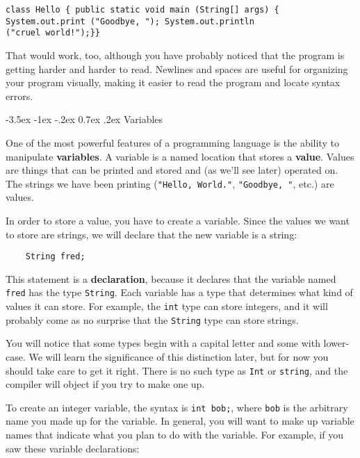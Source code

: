 \documentclass{book}
\makeatletter
\renewcommand{\section}{\@startsection 
    {section} {1} {0mm}%
    {-3.5ex \@plus -1ex \@minus -.2ex}%
    {0.7ex \@plus.2ex}%
    {\normalfont\Large\bfseries}}
\makeatother
\begin{document}
\begin{verbatim}
class Hello { public static void main (String[] args) {
System.out.print ("Goodbye, "); System.out.println
("cruel world!");}}
\end{verbatim}
%
That would work, too, although you have probably noticed that
the program is getting harder and harder to read.  Newlines and
spaces are useful for organizing your program visually, making
it easier to read the program and locate syntax errors.


\section {Variables}

One of the most powerful features of a programming language is the
ability to manipulate {\bf variables}.  A variable is a named location
that stores a {\bf value}.  Values are things that can be printed and
stored and (as we'll see later) operated on.  The strings we have been
printing ({\tt "Hello, World."}, {\tt "Goodbye, "}, etc.)  are values.

In order to store a value, you have to create a variable.  Since
the values we want to store are strings, we will declare that
the new variable is a string:

\begin{verbatim}
    String fred;
\end{verbatim}
%
This statement is a {\bf declaration}, because it declares that
the variable named {\tt fred} has the type {\tt String}.  Each
variable has a type that determines what kind of values it
can store.  For example, the {\tt int} type can store integers,
and it will probably come as no surprise that the {\tt String}
type can store strings.


You will notice that some types begin with a capital letter and some
with lower-case.  We will learn the significance of this distinction
later, but for now you should take care to get it right.  There is no
such type as {\tt Int} or {\tt string}, and the compiler will object
if you try to make one up.

To create an integer variable, the syntax is {\tt int bob;},
where {\tt bob} is the arbitrary name you made up for the
variable.  In general, you will want to make up variable names
that indicate what you plan to do with the variable.  For
example, if you saw these variable declarations:
\end{document}
